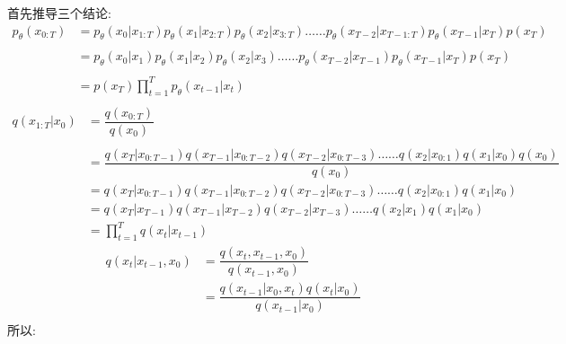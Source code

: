 \documentclass[withoutpreface,bwprint]{cumcmthesis} %
\begin{document}
	首先推导三个结论:
	\begin{align*}
		 p_{\theta}(x_{0:T}) & = p_{\theta}(x_0|x_{1:T}) p_{\theta}(x_1|x_{2:T}) p_{\theta}(x_2|x_{3:T}) \ldots \ldots p_{\theta}(x_{T-2}|x_{T-1:T}) p_{\theta}(x_{T-1}|x_{T}) p(x_{T}) \\  \\
		 & = p_{\theta}(x_0|x_{1}) p_{\theta}(x_1|x_{2}) p_{\theta}(x_2|x_{3}) \ldots \ldots p_{\theta}(x_{T-2}|x_{T-1}) p_{\theta}(x_{T-1}|x_{T}) p(x_{T}) \\\\  
		 & = p(x_T) \prod_{t=1}^{T} p_{\theta}(x_{t-1}|x_{t}) \\
	\end{align*}
	\begin{align*}
		q(x_{1:T}|x_0) & = \dfrac{q(x_{0:T})}{q(x_0)} \\\\
					& = \dfrac{  q(x_T|x_{0:T-1}) q(x_{T-1}|x_{0:T-2})  q(x_{T-2}|x_{0:T-3})  \ldots \ldots  q(x_2|x_{0:1}) q(x_1|x_{0}) q(x_0) }{q(x_0)}\\
					& = q(x_T|x_{0:T-1}) q(x_{T-1}|x_{0:T-2})  q(x_{T-2}|x_{0:T-3})  \ldots \ldots  q(x_2|x_{0:1}) q(x_1|x_{0}) \\
					& = q(x_T|x_{T-1}) q(x_{T-1}|x_{T-2})  q(x_{T-2}|x_{T-3})  \ldots \ldots  q(x_2|x_{1}) q(x_1|x_{0}) \\
					& = \prod_{t=1}^{T} q(x_{t}|x_{t-1})
	\end{align*}
	\begin{align*}
		q(x_t|x_{t-1},x_0) & =\dfrac{q(x_t,x_{t-1},x_0)}{q(x_{t-1},x_0)}\\
							& = \dfrac{q(x_{t-1}|x_0,x_t) q(x_t|x_0) }{q(x_{t-1}|x_0)}\\ 
	\end{align*}
	所以:
\end{document}

